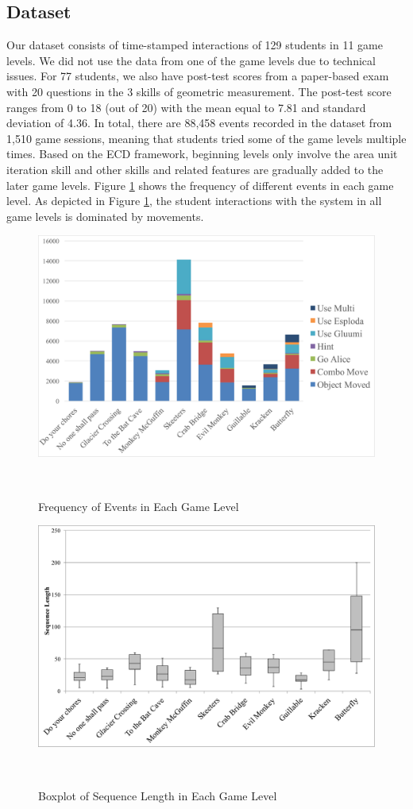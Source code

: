\documentclass{sigchi}
\begin{document}
	\subsection{Dataset} 
	Our dataset consists of time-stamped interactions of 129 students in 11 game levels.
	We did not use the data from one of the game levels due to technical issues.
	For 77 students, we also have post-test scores from a paper-based exam with 20 questions in the 3 skills of geometric measurement.
	The post-test score ranges from 0 to 18 (out of 20) with the mean equal to 7.81 and standard deviation of 4.36. 
	In total, there are 88,458 events recorded in the dataset from 1,510 game sessions, meaning that students tried some of the game levels  multiple times.
	Based on the ECD framework, beginning levels only involve the area unit iteration skill and other skills and related features are gradually added to the later game levels.
	Figure \ref{fig:frequency} shows the frequency of different events in each game level. As depicted in Figure \ref{fig:frequency}, the student interactions with the system in all game levels is dominated by movements.
	
	\begin{figure}
		\centering
		\includegraphics[width=0.9\columnwidth]{figures/frequency.pdf}
		\caption{Frequency of Events in Each Game Level}~\label{fig:frequency}
	\end{figure}
	
	
	\begin{figure}
		\centering
		\includegraphics[width=0.9\columnwidth]{figures/boxplot.pdf}
		\caption{Boxplot of Sequence Length in Each Game Level}~\label{fig:boxplot}
	\end{figure}
	
\end{document}
